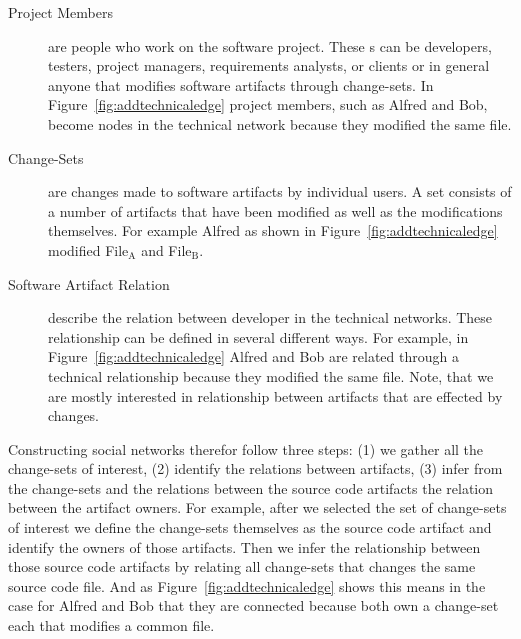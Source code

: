 \begin{description}
\item[Project Members] are people who work on the software project. 
These \people s can be developers, testers, project managers, requirements analysts,
or clients or in general anyone that modifies software artifacts through change-sets. 
In Figure~\ref{fig:addtechnicaledge} project members, such as Alfred and Bob, become nodes in the technical network because they modified the same file.

\item[Change-Sets] are changes made to software artifacts by individual users. 
A set consists of a number of artifacts that have been modified as well as the modifications themselves.
For example Alfred as shown in Figure~\ref{fig:addtechnicaledge} modified File$_{\text{A}}$ and File$_{\text{B}}$.

\item[Software Artifact Relation] describe the relation between developer in the technical networks.
These relationship can be defined in several different ways.
For example, in Figure~\ref{fig:addtechnicaledge} Alfred and Bob are related through a technical relationship because they modified the same file.
Note, that we are mostly interested in relationship between artifacts that are effected by changes.
\end{description}

Constructing social networks therefor follow three steps: (1) we gather all the change-sets of interest, (2) identify the relations between artifacts, (3) infer from the change-sets and the relations between the source code artifacts the relation between the artifact owners.
For example, after we selected the set of change-sets of interest we define the change-sets themselves as the source code artifact and identify the owners of those artifacts.
Then we infer the relationship between those source code artifacts by relating all change-sets that changes the same source code file.
And as Figure~\ref{fig:addtechnicaledge} shows this means in the case for Alfred and Bob that they are connected because both own a change-set each that modifies a common file.

